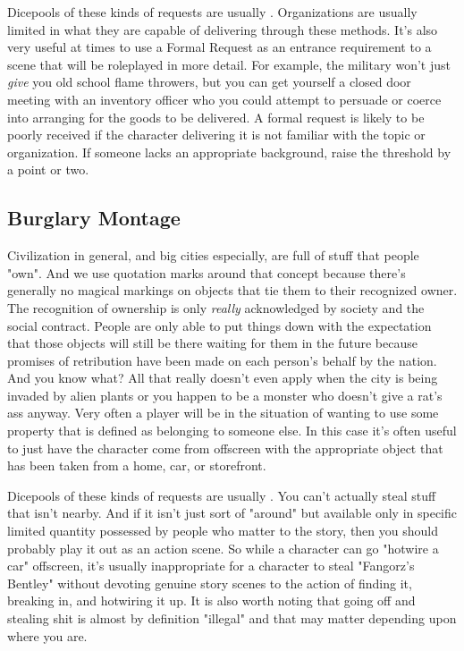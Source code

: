 Dicepools of these kinds of requests are usually . Organizations are usually limited in what they are capable of delivering through these methods. It's also very useful at times to use a Formal Request as an entrance requirement to a scene that will be roleplayed in more detail. For example, the military won't just \textit{give} you old school flame throwers, but you can get yourself a closed door meeting with an inventory officer who you could attempt to persuade or coerce into arranging for the goods to be delivered.  A formal request is likely to be poorly received if the character delivering it is not familiar with the topic or organization. If someone lacks an appropriate background, raise the threshold by a point or two.

\subsection{Burglary Montage}

Civilization in general, and big cities especially, are full of stuff that people "own". And we use quotation marks around that concept because there's generally no magical markings on objects that tie them to their recognized owner. The recognition of ownership is only \textit{really} acknowledged by society and the social contract. People are only able to put things down with the expectation that those objects will still be there waiting for them in the future because promises of retribution have been made on each person's behalf by the nation. And you know what? All that really doesn't even apply when the city is being invaded by alien plants or you happen to be a monster who doesn't give a rat's ass anyway. Very often a player will be in the situation of wanting to use some property that is defined as belonging to someone else. In this case it's often useful to just have the character come from offscreen with the appropriate object that has been taken from a home, car, or storefront. 

Dicepools of these kinds of requests are usually . You can't actually steal stuff that isn't nearby. And if it isn't just sort of "around" but available only in specific limited quantity possessed by people who matter to the story, then you should probably play it out as an action scene. So while a character can go "hotwire a car" offscreen, it's usually inappropriate for a character to steal "Fangorz's Bentley" without devoting genuine story scenes to the action of finding it, breaking in, and hotwiring it up. It is also worth noting that going off and stealing shit is almost by definition "illegal" and that may matter depending upon where you are.


